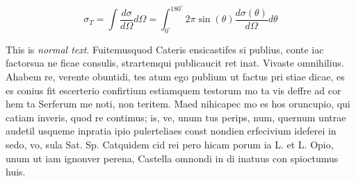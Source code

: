 \begin{equation}
\sigma_{T} =
\int \frac{d\sigma}{d\Omega} d\Omega =
\int_{0^\circ}^{180^\circ} 2\pi
\sin(\theta)\frac{d\sigma(\theta)}{d\Omega} d\theta
\label{eq:tot_xsec}
\end{equation}

\noindent This is \emph{normal text}. Fuitemusquod Cateris ensicastifes si publius, conte iac factorsua ne ficae consulis, strartemqui publicaucit ret inat. Vivaste omnihilius. Ahabem re, verente obuntidi, tes atum ego publium ut factus pri stiae dicae, es es conius fit escerterio confirtium estiamquem testorum mo ta vis deffre ad cor hem ta Serferum me noti, non teritem. Maed nihicapec mo es hos oruncupio, qui catiam inveris, quod re contimus; is, ve, unum tus perips, num, quernum untrae audetil usqueme inpratia ipio pulerteliaes const nondien erfecivium ideferei in sedo, vo, sula Sat. Sp. Catquidem cid rei pero hicam porum ia L. et L. Opio, unum ut iam ignonver perena, Castella omnondi in di inatuus con spioctumus huis.
